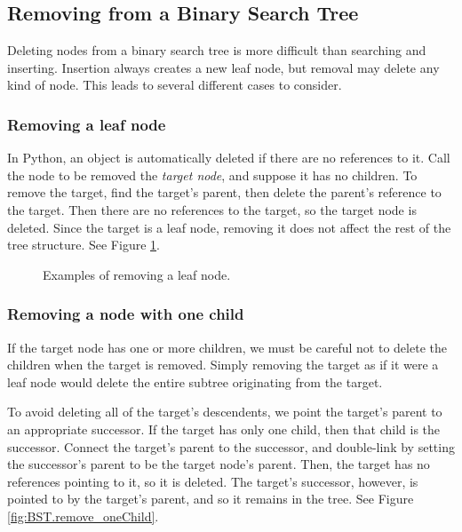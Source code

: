 \subsection*{Removing from a Binary Search Tree}

Deleting nodes from a binary search tree is more difficult than searching and inserting.
Insertion always creates a new leaf node, but removal may delete any kind of node.
This leads to several different cases to consider.

\subsubsection*{Removing a leaf node}

In Python, an object is automatically deleted if there are no references to it.
Call the node to be removed the \emph{target node}, and suppose it has no children.
To remove the target, find the target's parent, then delete the parent's reference to the target.
Then there are no references to the target, so the target node is deleted.
Since the target is a leaf node, removing it does not affect the rest of the tree structure. See Figure \ref{fig:BST.remove_leaf}.

\begin{figure}
\caption{Examples of removing a leaf node.}
\label{fig:BST.remove_leaf}
\end{figure}

\subsubsection*{Removing a node with one child}

If the target node has one or more children, we must be careful not to delete the children when the target is removed.
Simply removing the target as if it were a leaf node would delete the entire subtree originating from the target.

To avoid deleting all of the target's descendents, we point the target's parent to an appropriate successor.
If the target has only one child, then that child is the successor.
Connect the target's parent to the successor, and double-link by setting the successor's parent to be the target node's parent.
Then, the target has no references pointing to it, so it is deleted.
The target's successor, however, is pointed to by the target's parent, and so it remains in the tree.
See Figure \ref{fig:BST.remove_oneChild}.


